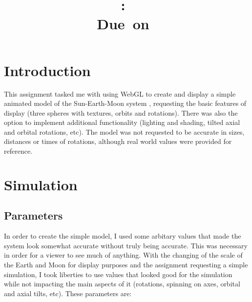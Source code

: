 \documentclass[12pt]{article}
\title{
\vspace{2in}
\textmd{\textbf{\hmwkClass:\ \hmwkTitle}}\\
\normalsize\vspace{0.1in}\small{Due\ on\ \hmwkDueDate}\\
\vspace{3in}
}
\author{\textbf{\hmwkAuthorName}}
\date{} %
\begin{document}
\maketitle



\newpage
\tableofcontents
\newpage



\section{Introduction}
This assignment tasked me with using WebGL to create and display a simple animated model of the Sun-Earth-Moon system \cite{assignment}, requesting the basic features of display (three spheres with textures, orbits and rotations). There was also the option to implement additional functionality (lighting and shading, tilted axial and orbital rotations, etc). The model was not requested to be accurate in sizes, distances or times of rotations, although real world values were provided for reference.

\section{Simulation}
\subsection{Parameters}
In order to create the simple model, I used some arbitary values that made the system look somewhat accurate without truly being accurate. This was necessary in order for a viewer to see much of anything. With the changing of the scale of the Earth and Moon for display purposes and the assignment requesting a simple simulation, I took liberties to use values that looked good for the simulation while not impacting the main aspects of it (rotations, spinning on axes, orbital and axial tilts, etc). These parameters are:
\end{document}
